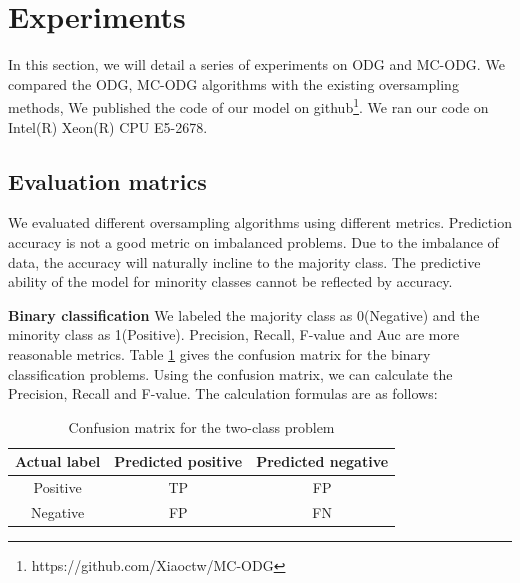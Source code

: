 \documentclass[ida]{iosart2x}
\begin{document}
\section{Experiments}

In this section, we will detail a series of experiments on ODG and MC-ODG.
We compared the ODG, MC-ODG algorithms with the existing oversampling methods,
We published the code of our model on github\footnote{https://github.com/Xiaoctw/MC-ODG}.
We ran our code on Intel(R) Xeon(R) CPU E5-2678.
\subsection{Evaluation matrics}

We evaluated different oversampling algorithms using different metrics. 
Prediction accuracy is not a good metric on imbalanced problems.
Due to the imbalance of data, the accuracy will naturally incline to the majority class.
The predictive ability of the model for minority classes cannot be reflected by accuracy.

\textbf{Binary classification} We labeled the majority class as 0(Negative) and the minority class as 1(Positive).
Precision, Recall, F-value and Auc are more reasonable metrics.
Table \ref{table1} gives the confusion matrix for the binary classification problems.
Using the confusion matrix, 
  we can calculate the Precision, Recall and F-value. The calculation formulas are as follows:

\begin{table}[tb]
  \caption{Confusion matrix for the two-class problem}
  \label{table1}
  \centering
  \begin{tabular}{@{}ccc@{}}
  \toprule
  Actual label & \multicolumn{1}{l}{Predicted positive} & \multicolumn{1}{l}{Predicted negative} \\ \midrule
  Positive     & TP                                     & FP                                     \\
  Negative     & FP                                     & FN                                     \\ \bottomrule
  \end{tabular}
\end{table}
\end{document}
